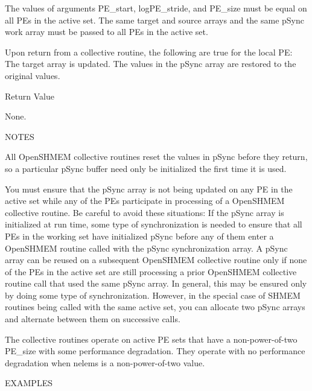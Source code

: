       The values of arguments PE_start, logPE_stride,	and  PE_size  must  be
       equal  on all PEs in the active set.  The same target and source arrays
       and the same pSync work array must be passed to all PEs in  the	active
       set.

       Upon  return  from a collective routine, the following are true for the
       local PE: The target array is updated.  The values in the  pSync	 array
       are restored to the original values.

Return Value

	None.

NOTES

       All  OpenSHMEM  collective  routines	 reset the values in pSync before they
       return, so a particular pSync buffer need only be initialized the first
       time it is used.

       You  must ensure that the pSync array is not being updated on any PE in
       the active set while any of the PEs  participate	 in  processing	 of  a
       OpenSHMEM collective routine.  Be careful to avoid these situations: If the
       pSync array is initialized at run time, some type of synchronization is
       needed to ensure that all PEs in the working set have initialized pSync
       before any of  them  enter  a  OpenSHMEM  routine  called  with  the	 pSync
       synchronization	array.	 A  pSync  array can be reused on a subsequent
       OpenSHMEM collective routine only if none of the PEs in the active set  are
       still  processing  a  prior OpenSHMEM collective routine call that used the
       same pSync array.  In general, this may be ensured only by  doing  some
       type  of	 synchronization.   However,  in  the  special	case  of SHMEM
       routines being called with the same active set, you  can	 allocate  two
       pSync arrays and alternate between them on successive calls.

       The  collective	routines  operate  on  active  PE  sets	 that  have  a
       non-power-of-two	 PE_size  with	some  performance  degradation.	  They
       operate	 with	no   performance   degradation	 when	nelems	is   a
       non-power-of-two value.

EXAMPLES
	

	
